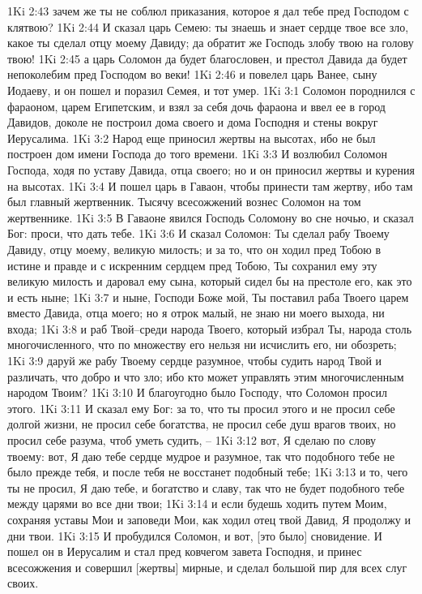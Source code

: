 1Ki 2:43  зачем же ты не соблюл приказания, которое я дал тебе пред Господом с клятвою?
1Ki 2:44  И сказал царь Семею: ты знаешь и знает сердце твое все зло, какое ты сделал отцу моему Давиду; да обратит же Господь злобу твою на голову твою!
1Ki 2:45  а царь Соломон да будет благословен, и престол Давида да будет непоколебим пред Господом во веки!
1Ki 2:46  и повелел царь Ванее, сыну Иодаеву, и он пошел и поразил Семея, и тот умер.
1Ki 3:1  Соломон породнился с фараоном, царем Египетским, и взял за себя дочь фараона и ввел ее в город Давидов, доколе не построил дома своего и дома Господня и стены вокруг Иерусалима.
1Ki 3:2  Народ еще приносил жертвы на высотах, ибо не был построен дом имени Господа до того времени.
1Ki 3:3  И возлюбил Соломон Господа, ходя по уставу Давида, отца своего; но и он приносил жертвы и курения на высотах.
1Ki 3:4  И пошел царь в Гаваон, чтобы принести там жертву, ибо там был главный жертвенник. Тысячу всесожжений вознес Соломон на том жертвеннике.
1Ki 3:5  В Гаваоне явился Господь Соломону во сне ночью, и сказал Бог: проси, что дать тебе.
1Ki 3:6  И сказал Соломон: Ты сделал рабу Твоему Давиду, отцу моему, великую милость; и за то, что он ходил пред Тобою в истине и правде и с искренним сердцем пред Тобою, Ты сохранил ему эту великую милость и даровал ему сына, который сидел бы на престоле его, как это и есть ныне;
1Ki 3:7  и ныне, Господи Боже мой, Ты поставил раба Твоего царем вместо Давида, отца моего; но я отрок малый, не знаю ни моего выхода, ни входа;
1Ki 3:8  и раб Твой--среди народа Твоего, который избрал Ты, народа столь многочисленного, что по множеству его нельзя ни исчислить его, ни обозреть;
1Ki 3:9  даруй же рабу Твоему сердце разумное, чтобы судить народ Твой и различать, что добро и что зло; ибо кто может управлять этим многочисленным народом Твоим?
1Ki 3:10  И благоугодно было Господу, что Соломон просил этого.
1Ki 3:11  И сказал ему Бог: за то, что ты просил этого и не просил себе долгой жизни, не просил себе богатства, не просил себе душ врагов твоих, но просил себе разума, чтоб уметь судить, --
1Ki 3:12  вот, Я сделаю по слову твоему: вот, Я даю тебе сердце мудрое и разумное, так что подобного тебе не было прежде тебя, и после тебя не восстанет подобный тебе;
1Ki 3:13  и то, чего ты не просил, Я даю тебе, и богатство и славу, так что не будет подобного тебе между царями во все дни твои;
1Ki 3:14  и если будешь ходить путем Моим, сохраняя уставы Мои и заповеди Мои, как ходил отец твой Давид, Я продолжу и дни твои.
1Ki 3:15  И пробудился Соломон, и вот, [это было] сновидение. И пошел он в Иерусалим и стал пред ковчегом завета Господня, и принес всесожжения и совершил [жертвы] мирные, и сделал большой пир для всех слуг своих.
